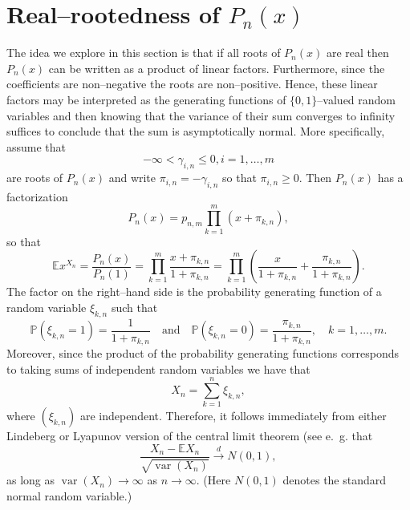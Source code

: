 \documentclass[10pt]{amsart}
\numberwithin{subcase}{case}
\begin{document}
\section{Real--rootedness of $P_n(x)$}
The idea we explore in this section is that if all roots of $P_n(x)$ are real then $P_n(x)$ can be written as a product of linear factors. Furthermore, since the coefficients are non--negative the roots are non--positive. Hence, these linear factors may be interpreted as the generating functions of $\{0,1\}$--valued random variables and then knowing that the variance of their sum converges to infinity suffices to conclude that the sum is asymptotically normal. More specifically, assume that  
\[-\infty<\gamma_{i,n}\le0, i=1,\dots,m\]
are roots of $P_n(x)$ and write $\pi_{i,n}=-\gamma_{i,n}$ so that $\pi_{i,n}\ge0$.
Then $P_n(x)$ has a factorization 
\[P_n(x)=p_{n,m}\prod_{k=1}^m(x+\pi_{k,n}),\]
so that 
\[{\mathbb{E}} x^{X_n}=\frac{P_n(x)}{P_n(1)}=\prod_{k=1}^m\frac{x+\pi_{k,n}}{1+\pi_{k,n}}=\prod_{k=1}^m\left(\frac x{1+\pi_{k,n}}+\frac{\pi_{k,n}}{1+\pi_{k,n}}\right).
\] 
The factor on the right--hand side is the probability generating function of a random variable $\xi_{k,n}$ such that 
\[{\mathbb{P}}(\xi_{k,n}=1)=\frac1{1+\pi_{k,n}} \quad\mbox{and}\quad{\mathbb{P}}(\xi_{k,n}=0)=\frac{\pi_{k,n}}{1+\pi_{k,n}},\quad k=1,\dots,m.\]
Moreover, since the product of the probability generating functions corresponds to taking sums of independent random variables 
we have that 
\[X_n=\sum_{k=1}^n\xi_{k,n},\]
where $(\xi_{k,n})$ are independent. Therefore, it follows immediately from either Lindeberg or Lyapunov version of the central limit theorem (see e.~g. \cite[Theorem~27.2 or Theorem~27.3]{Bil} that 
\[\frac{X_n-{\mathbb{E}} X_n}{\sqrt{{\operatorname{var}}(X_n)}}\stackrel d\longrightarrow N(0,1),\]
as long as ${\operatorname{var}}(X_n)\longrightarrow\infty$ as $n\to\infty$. (Here $N(0,1)$ denotes the standard normal random variable.)
\end{document}
